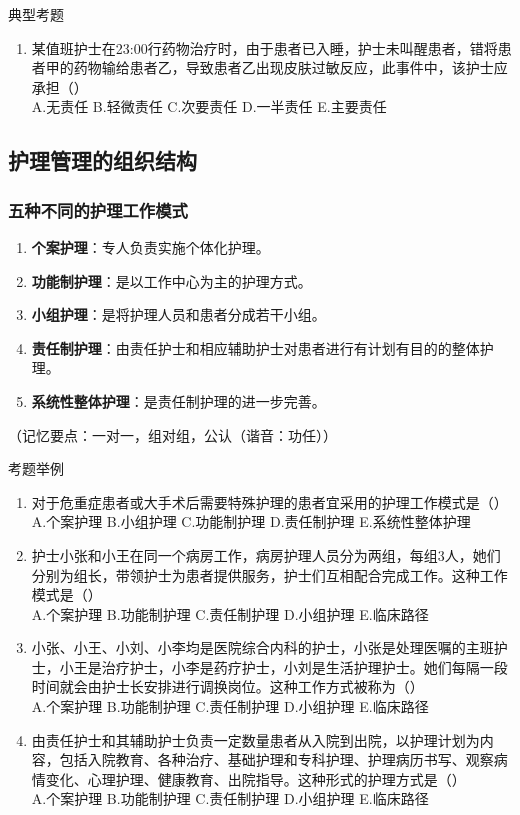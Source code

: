 \documentclass[11pt, a4paper]{ctexart}
\begin{document}
\begin{examplebox}{典型考题}
	\begin{enumerate}
		\item 某值班护士在23:00行药物治疗时，由于患者已入睡，护士未叫醒患者，错将患者甲的药物输给患者乙，导致患者乙出现皮肤过敏反应，此事件中，该护士应承担（\qquad）\\
		      A.无责任 \quad B.轻微责任 \quad C.次要责任 \quad D.一半责任 \quad E.主要责任
	\end{enumerate}
\end{examplebox}

\subsection{护理管理的组织结构}
\subsubsection{五种不同的护理工作模式}
\begin{enumerate}
	\item \textbf{个案护理}：专人负责实施个体化护理。
	\item \textbf{功能制护理}：是以工作中心为主的护理方式。
	\item \textbf{小组护理}：是将护理人员和患者分成若干小组。
	\item \textbf{责任制护理}：由责任护士和相应辅助护士对患者进行有计划有目的的整体护理。
	\item \textbf{系统性整体护理}：是责任制护理的进一步完善。
\end{enumerate}
（记忆要点：一对一，组对组，公认（谐音：功任））

\begin{examplebox}{考题举例}
	\begin{enumerate}
		\item 对于危重症患者或大手术后需要特殊护理的患者宜采用的护理工作模式是（\qquad）\\
		      A.个案护理 \quad B.小组护理 \quad C.功能制护理 \quad D.责任制护理 \quad E.系统性整体护理
		\item 护士小张和小王在同一个病房工作，病房护理人员分为两组，每组3人，她们分别为组长，带领护士为患者提供服务，护士们互相配合完成工作。这种工作模式是（\qquad）\\
		      A.个案护理 \quad B.功能制护理 \quad C.责任制护理 \quad D.小组护理 \quad E.临床路径
		\item 小张、小王、小刘、小李均是医院综合内科的护士，小张是处理医嘱的主班护士，小王是治疗护士，小李是药疗护士，小刘是生活护理护士。她们每隔一段时间就会由护士长安排进行调换岗位。这种工作方式被称为（\qquad）\\
		      A.个案护理 \quad B.功能制护理 \quad C.责任制护理 \quad D.小组护理 \quad E.临床路径
		\item 由责任护士和其辅助护士负责一定数量患者从入院到出院，以护理计划为内容，包括入院教育、各种治疗、基础护理和专科护理、护理病历书写、观察病情变化、心理护理、健康教育、出院指导。这种形式的护理方式是（\qquad）\\
		      A.个案护理 \quad B.功能制护理 \quad C.责任制护理 \quad D.小组护理 \quad E.临床路径
	\end{enumerate}
\end{examplebox}
\end{document}
